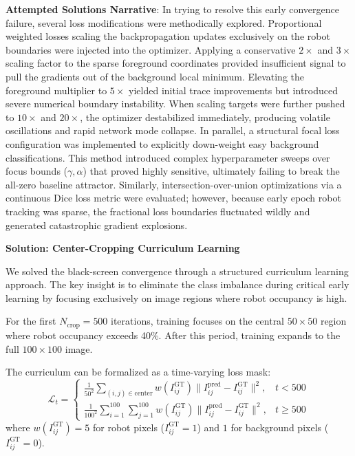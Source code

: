 \documentclass[12pt,a4paper,oneside]{report}
\begin{document}
\textbf{Attempted Solutions Narrative}: In trying to resolve this early convergence failure, several loss modifications were methodically explored. Proportional weighted losses scaling the backpropagation updates exclusively on the robot boundaries were injected into the optimizer. Applying a conservative $2\times$ and $3\times$ scaling factor to the sparse foreground coordinates provided insufficient signal to pull the gradients out of the background local minimum. Elevating the foreground multiplier to $5\times$ yielded initial trace improvements but introduced severe numerical boundary instability. When scaling targets were further pushed to $10\times$ and $20\times$, the optimizer destabilized immediately, producing volatile oscillations and rapid network mode collapse. In parallel, a structural focal loss configuration was implemented to explicitly down-weight easy background classifications. This method introduced complex hyperparameter sweeps over focus bounds ($\gamma, \alpha$) that proved highly sensitive, ultimately failing to break the all-zero baseline attractor. Similarly, intersection-over-union optimizations via a continuous Dice loss metric were evaluated; however, because early epoch robot tracking was sparse, the fractional loss boundaries fluctuated wildly and generated catastrophic gradient explosions.

\textbf{Solution: Center-Cropping Curriculum Learning}

We solved the black-screen convergence through a structured curriculum learning approach. The key insight is to eliminate the class imbalance during critical early learning by focusing exclusively on image regions where robot occupancy is high.

For the first $N_{\text{crop}} = 500$ iterations, training focuses on the central $50 \times 50$ region where robot occupancy exceeds 40\%. After this period, training expands to the full $100 \times 100$ image.

The curriculum can be formalized as a time-varying loss mask:
\begin{equation}
\mathcal{L}_t = \begin{cases}
\frac{1}{50^2} \sum_{(i,j) \in \text{center}} w(I_{ij}^{\text{GT}}) \|I_{ij}^{\text{pred}} - I_{ij}^{\text{GT}}\|^2, & t < 500 \\
\frac{1}{100^2} \sum_{i=1}^{100}\sum_{j=1}^{100} w(I_{ij}^{\text{GT}}) \|I_{ij}^{\text{pred}} - I_{ij}^{\text{GT}}\|^2, & t \geq 500
\end{cases}
\end{equation}
where $w(I_{ij}^{\text{GT}}) = 5$ for robot pixels ($I_{ij}^{\text{GT}} = 1$) and $1$ for background pixels ($I_{ij}^{\text{GT}} = 0$).
\end{document}
